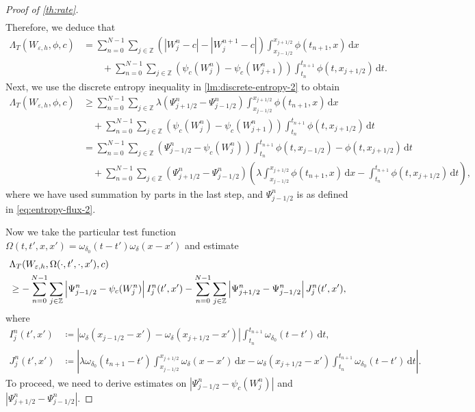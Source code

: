 \documentclass[10pt]{amsart}
\theoremstyle{plain}
\theoremstyle{definition}
\numberwithin{equation}{section}
\newcommand{\eps}{{\varepsilon}}
\newcommand{\dt}{{\, \mathrm{d}t}}
\newcommand{\dx}{{\, \mathrm{d}x}}
\begin{document}
\begin{proof}[Proof of \cref{th:rate}]
\begin{align*}
\end{align*}
Therefore, we deduce that
\begin{align*}
    \Lambda_T(W_{\eps,h}, \phi, c) &= \sum_{n=0}^{N-1} \sum_{j\in\mathbb{Z}} \left( |W_j^n-c| - |W_j^{n+1}-c| \right) \int_{x_{j-1/2}}^{x_{j+1/2}} \phi(t_{n+1},x) \dx \\
    &\qquad + \sum_{n=0}^{N-1}\sum_{j\in\mathbb{Z}} \left( \psi_c(W_j^n)-\psi_c(W_{j+1}^n) \right) \int_{t_n}^{t_{n+1}} \phi(t,x_{j+1/2}) \dt.
\end{align*}
Next, we use the discrete entropy inequality  in \cref{lm:discrete-entropy-2} to obtain
\begin{align*}
    \Lambda_T(W_{\eps,h}, \phi, c) &\geq \sum_{n=0}^{N-1} \sum_{j\in\mathbb{Z}} \lambda (\Psi_{j+1/2}^n - \Psi_{j-1/2}^n) \int_{x_{j-1/2}}^{x_{j+1/2}} \phi(t_{n+1},x) \dx \\
    &\quad + \sum_{n=0}^{N-1}\sum_{j\in\mathbb{Z}} \left( \psi_c(W_j^n)-\psi_c(W_{j+1}^n) \right) \int_{t_n}^{t_{n+1}} \phi(t,x_{j+1/2}) \dt \\
    &= \sum_{n=0}^{N-1} \sum_{j\in\mathbb{Z}} \left( \Psi_{j-1/2}^n - \psi_c(W_j^n) \right) \int_{t_n}^{t_{n+1}} \phi(t,x_{j-1/2}) - \phi(t,x_{j+1/2}) \dt \\
    &\quad + \sum_{n=0}^{N-1}\sum_{j\in\mathbb{Z}} \left( \Psi_{j+1/2}^n - \Psi_{j-1/2}^n \right) \left( \lambda \int_{x_{j-1/2}}^{x_{j+1/2}} \phi(t_{n+1},x) \dx - \int_{t_n}^{t_{n+1}} \phi(t,x_{j+1/2}) \dt \right),
\end{align*}
where we have used summation by parts in the last step, and $\Psi_{j-1/2}^n$ is as defined in \cref{eq:entropy-flux-2}.

Now we take the particular test function $\Omega(t,t',x,x') = \omega_{\delta_0}(t-t')\omega_\delta(x-x')$
and estimate
\begin{align}\label{eq:estm_LamT}
    &\Lambda_T(W_{\eps,h}, \Omega(\cdot,t',\cdot,x'), c) \\
    &\geq -\sum_{n=0}^{N-1} \sum_{j\in\mathbb{Z}} \left| \Psi_{j-1/2}^n - \psi_c(W_j^n) \right| I_j^n(t',x') - \sum_{n=0}^{N-1}\sum_{j\in\mathbb{Z}} \left| \Psi_{j+1/2}^n - \Psi_{j-1/2}^n \right| J_j^n(t',x'), \notag
\end{align}
where
\begin{align*}
    I_j^n(t',x') &\coloneqq \left| \omega_\delta(x_{j-1/2}-x') - \omega_\delta(x_{j+1/2}-x') \right| \int_{t_n}^{t_{n+1}} \omega_{\delta_0}(t-t') \dt, \\
    J_j^n(t',x') &\coloneqq \left| \lambda \omega_{\delta_0}(t_{n+1}-t') \int_{x_{j-1/2}}^{x_{j+1/2}} \omega_\delta(x-x') \dx - \omega_\delta(x_{j+1/2}-x') \int_{t_n}^{t_{n+1}} \omega_{\delta_0}(t-t') \dt \right|.
\end{align*}
To proceed, we need to derive estimates on $\left|\Psi_{j-1/2}^n - \psi_c(W_j^n)\right|$ and $\left|\Psi_{j+1/2}^n - \Psi_{j-1/2}^n\right|$.


\end{proof}
\end{document}
